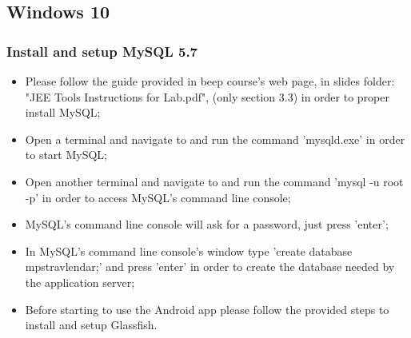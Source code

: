 \subsection{Windows 10}
\label{subsect:Windows 10}

\subsubsection{Install and setup MySQL 5.7}
\begin{itemize}
	\item Please follow the guide provided in beep course's web page, in slides folder: "JEE Tools Instructions for Lab.pdf", (only section 3.3) in order to proper install MySQL;
	\item Open a terminal and navigate to  and run the command 'mysqld.exe' in order to start MySQL;
	\item Open another terminal and navigate to  and run the command 'mysql -u root -p' in order to access MySQL's command line console;
	\item MySQL's command line console will ask for a password, just press 'enter';
	\item In MySQL's command line console's window type 'create database mps\textunderscore travlendar;' and press 'enter' in order to create the database needed by the application server;
	\item Before starting to use the Android app please follow the provided steps to install and setup Glassfish.
\end{itemize}


